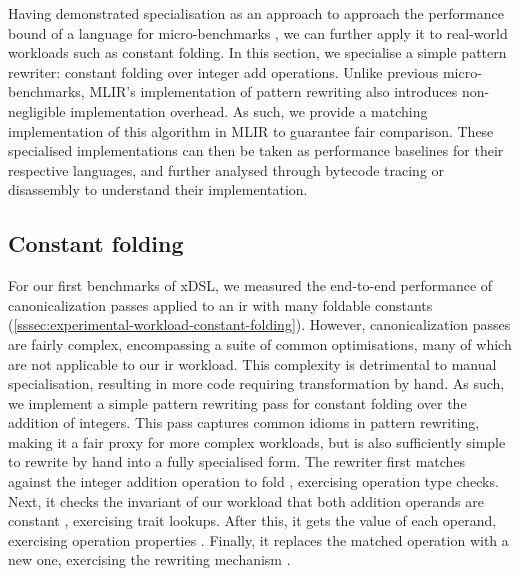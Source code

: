 Having demonstrated specialisation as an approach to approach the performance bound of a language for micro-benchmarks%
, we can further apply it to real-world workloads such as constant folding.
In this section, we specialise a simple pattern rewriter: constant folding over integer add operations. Unlike previous micro-benchmarks, MLIR's implementation of pattern rewriting also introduces non-negligible implementation overhead. As such, we provide a matching implementation of this algorithm in MLIR to guarantee fair comparison.
These specialised implementations can then be taken as performance baselines for their respective languages, and further analysed through bytecode tracing or disassembly to understand their implementation.


\subsection{Constant folding}
\label{sec:specialising-pattern-rewriting-workload}

For our first benchmarks of xDSL, we measured the end-to-end performance of canonicalization passes applied to an \ac{ir} with many foldable constants (\autoref{sssec:experimental-workload-constant-folding}).
However, canonicalization passes are fairly complex, encompassing a suite of common optimisations, many of which are not applicable to our \ac{ir} workload. This complexity is detrimental to manual specialisation, resulting in more code requiring transformation by hand.
As such, we implement a simple pattern rewriting pass for constant folding over the addition of integers. This pass captures common idioms in pattern rewriting, making it a fair proxy for more complex workloads, but is also sufficiently simple to rewrite by hand into a fully specialised form.
The rewriter first matches against the integer addition operation to fold , exercising operation type checks. Next, it checks the invariant of our workload that both addition operands are constant , exercising trait lookups. After this, it gets the value of each operand, exercising operation properties . Finally, it replaces the matched operation with a new one, exercising the rewriting mechanism .

